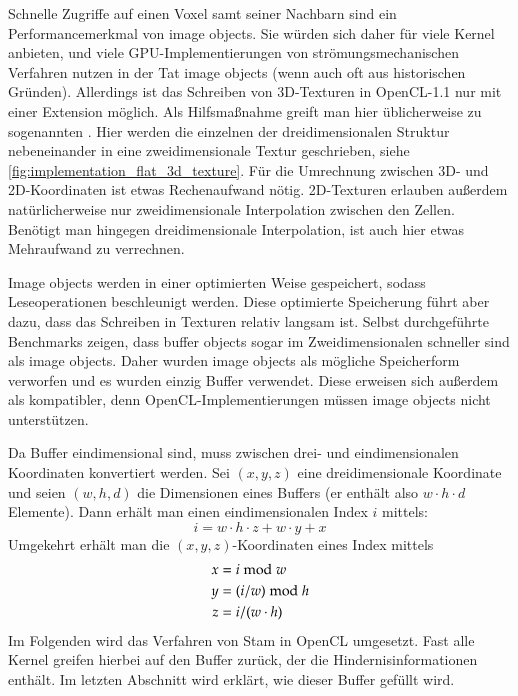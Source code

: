 Schnelle Zugriffe auf einen Voxel samt seiner Nachbarn sind ein
Performancemerkmal von image objects. Sie würden sich daher für viele Kernel
anbieten, und viele GPU-Implementierungen von
strömungsmechanischen Verfahren nutzen in der Tat image objects (wenn auch
oft aus historischen Gründen). Allerdings ist das Schreiben von
3D-Texturen in OpenCL-1.1 nur mit einer Extension möglich. Als
Hilfsmaßnahme greift man hier üblicherweise zu sogenannten
 \cite{Harris2003}. Hier werden die
einzelnen  der dreidimensionalen Struktur
nebeneinander in eine zweidimensionale Textur geschrieben, siehe
\autoref{fig:implementation_flat_3d_texture}. Für die Umrechnung
zwischen 3D- und 2D-Koordinaten ist etwas Rechenaufwand
nötig. 2D-Texturen erlauben außerdem natürlicherweise nur
zweidimensionale Interpolation zwischen den Zellen. Benötigt man
hingegen dreidimensionale Interpolation, ist auch hier etwas
Mehraufwand zu verrechnen.

Image objects werden in einer optimierten Weise gespeichert, sodass
Leseoperationen beschleunigt werden. Diese optimierte Speicherung
führt aber dazu, dass das Schreiben in Texturen relativ langsam
ist. Selbst durchgeführte Benchmarks zeigen, dass buffer objects sogar im
Zweidimensionalen schneller sind als image objects. Daher wurden image objects
als mögliche Speicherform verworfen und es wurden einzig Buffer
verwendet. Diese erweisen sich außerdem als kompatibler, denn
OpenCL-Implementierungen müssen image objects nicht unterstützen.

Da Buffer eindimensional sind, muss zwischen drei- und
eindimensionalen Koordinaten konvertiert werden. Sei $(x,y,z)$ eine
dreidimensionale Koordinate und seien $(w,h,d)$ die Dimensionen eines
Buffers (er enthält also $w \cdot h \cdot d$ Elemente). Dann erhält
man einen eindimensionalen Index $i$ mittels:
\begin{equation}
\label{eq:implementation_wind_3d_to_2d}
i = w \cdot h \cdot z + w \cdot y + x
\end{equation}
Umgekehrt erhält man die $(x,y,z)$-Koordinaten eines Index mittels
\begin{equation}
\begin{split}
x &= i \bmod w \\
y &= (i / w) \bmod h \\
z &= i / (w \cdot h)  \\
\end{split}
\end{equation}
Im Folgenden wird das Verfahren von Stam in OpenCL umgesetzt. Fast
alle Kernel greifen hierbei auf den Buffer zurück, der die
Hindernisinformationen enthält. Im letzten Abschnitt wird erklärt, wie
dieser Buffer gefüllt wird.

